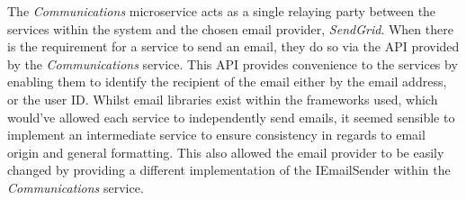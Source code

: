 The \textit{Communications} microservice acts as a single relaying party between the services within the system and the chosen email provider, \textit{SendGrid}. When there is the requirement for a service to send an email, they do so via the API provided by the \textit{Communications} service. This API provides convenience to the services by enabling them to identify the recipient of the email either by the email address, or the user ID. Whilst email libraries exist within the frameworks used, which would've allowed each service to independently send emails, it seemed sensible to implement an intermediate service to ensure consistency in regards to email origin and general formatting. This also allowed the email provider to be easily changed by providing a different implementation of the IEmailSender within the \textit{Communications} service.
